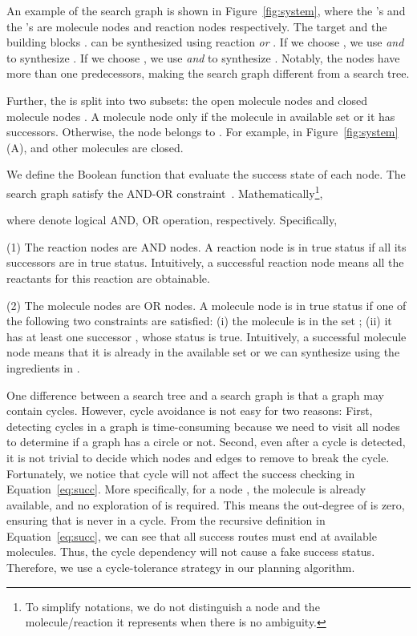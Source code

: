 \documentclass[sigconf]{acmart}
\begin{document}
An example of the search graph is shown in Figure~\ref{fig:system}, where the 's and the 's are molecule nodes and reaction nodes respectively.
The target  and the building blocks .
 can be synthesized using reaction  {\em or} . If we choose , we use  {\em and }  to synthesize . If we choose , we use  {\em and}  to synthesize .
Notably, the nodes  have more than one predecessors, making the search graph different from a search tree.

Further, the  is split into two subsets: the open molecule nodes  and closed molecule nodes .
A molecule node  only if the molecule in available set  or it has successors.
Otherwise, the node belongs to .
For example, in Figure~\ref{fig:system}(A),  and other molecules are closed. 

We define the Boolean function  that evaluate the success state of each node. The search graph satisfy the AND-OR constraint~\citep{Chen2020}.
Mathematically\footnote{To simplify notations, we do not distinguish a node and the molecule/reaction it represents when there is no ambiguity.},

where  denote logical AND, OR operation, respectively. Specifically,

(1) The reaction nodes are AND nodes. A reaction node is in true status if all its successors are in true status. Intuitively, a successful reaction node means all the reactants for this reaction are obtainable.

(2) The molecule nodes are OR nodes. A molecule node  is in true status if one of the following two constraints are satisfied: (i) the molecule  is in the set ; (ii) it has at least one successor , whose status is true. Intuitively, a successful molecule node means that it is already in the available set or we can synthesize  using the ingredients in .

One difference between a search tree and a search graph is that a graph may contain cycles.
However, cycle avoidance is not easy for two reasons:
First, detecting cycles in a graph is time-consuming because we need to visit all nodes to determine if a graph has a circle or not.
Second, even after a cycle is detected, it is not trivial to decide which nodes and edges to remove to break the cycle.
Fortunately, we notice that cycle will not affect the success checking in Equation~\eqref{eq:succ}.
More specifically, for a node , the molecule is already available, and no exploration of  is required.
This means the out-degree of  is zero, ensuring that  is never in a cycle.
From the recursive definition in Equation~\eqref{eq:succ}, we can see that all success routes must end at available molecules.
Thus, the cycle dependency will not cause a fake success status.
Therefore, we use a cycle-tolerance strategy in our planning algorithm. 
\end{document}
